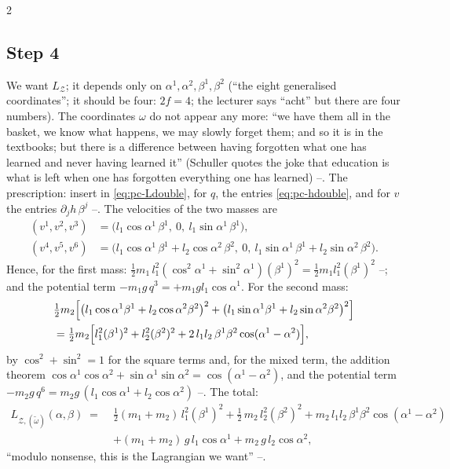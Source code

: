 \begin{paracol}{2}
\subsection{Step 4}\label{ssec:pc-d4}

We want $L_{\mathcal Z}$; it depends only on $\alpha^1,\alpha^2,\beta^1,\beta^2$ (``the eight generalised coordinates''; it should be four: $2f=4$; the lecturer says ``acht'' but there are four numbers). The coordinates $\omega$ do not appear any more: ``we have them all in the basket, we know what happens, we may slowly forget them; and so it is in the textbooks; but there is a difference between having forgotten what one has learned and never having learned it'' (Schuller quotes the joke that education is what is left when one has forgotten everything one has learned) --. The prescription: insert in \eqref{eq:pc-Ldouble}, for $q$, the entries \eqref{eq:pc-hdouble}, and for $v$ the entries $\partial_jh\,\beta^j$ --. The velocities of the two masses are
\[
  \begin{aligned}
  (v^1,v^2,v^3)&=\bigl(l_1\cos\alpha^1\,\beta^1,\ 0,\ l_1\sin\alpha^1\,\beta^1\bigr),\\
  (v^4,v^5,v^6)&=\bigl(l_1\cos\alpha^1\,\beta^1+l_2\cos\alpha^2\,\beta^2,\ 0,\ l_1\sin\alpha^1\,\beta^1+l_2\sin\alpha^2\,\beta^2\bigr).
  \end{aligned}
\]
Hence, for the first mass: $\tfrac12m_1\,l_1^2(\cos^2\alpha^1+\sin^2\alpha^1)(\beta^1)^2=\tfrac12m_1l_1^2(\beta^1)^2$ --; and the potential term $-m_1g\,q^3=+m_1gl_1\cos\alpha^1$. For the second mass:
\begin{align*}
    &\tfrac12m_2\Bigl[\bigl(l_1\cos\alpha^1\beta^1+l_2\cos\alpha^2\beta^2\bigr)^2+\bigl(l_1\sin\alpha^1\beta^1+l_2\sin\alpha^2\beta^2\bigr)^2\Bigr]\\
  &=\tfrac12m_2\Bigl[l_1^2(\beta^1)^2+l_2^2(\beta^2)^2+2\,l_1l_2\,\beta^1\beta^2\cos(\alpha^1-\alpha^2)\Bigr],
\end{align*}
by $\cos^2+\sin^2=1$ for the square terms and, for the mixed term, the addition theorem $\cos\alpha^1\cos\alpha^2+\sin\alpha^1\sin\alpha^2=\cos(\alpha^1-\alpha^2)$, and the potential term $-m_2g\,q^6=m_2g\,(l_1\cos\alpha^1+l_2\cos\alpha^2)$ --. The total:
\begin{equation}\label{eq:pc-LZdouble}
  \begin{aligned}
  L_{\mathcal Z,(\tilde\omega)}(\alpha,\beta)\;=\;&\tfrac12(m_1+m_2)\,l_1^2(\beta^1)^2+\tfrac12\,m_2\,l_2^2(\beta^2)^2+m_2\,l_1l_2\,\beta^1\beta^2\cos(\alpha^1-\alpha^2)\\
  &+(m_1+m_2)\,g\,l_1\cos\alpha^1+m_2\,g\,l_2\cos\alpha^2 ,
  \end{aligned}
\end{equation}
``modulo nonsense, this is the Lagrangian we want'' --.


\end{paracol}
